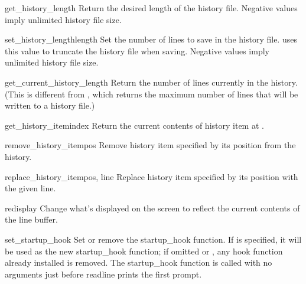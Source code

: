 \begin{funcdesc}{get_history_length}{}
Return the desired length of the history file.  Negative values imply
unlimited history file size.
\end{funcdesc}

\begin{funcdesc}{set_history_length}{length}
Set the number of lines to save in the history file.
 uses this value to truncate the
history file when saving.  Negative values imply unlimited history
file size.
\end{funcdesc}

\begin{funcdesc}{get_current_history_length}{}
Return the number of lines currently in the history.  (This is different
from , which returns the maximum number of
lines that will be written to a history file.)  
\end{funcdesc}

\begin{funcdesc}{get_history_item}{index}
Return the current contents of history item at .
\end{funcdesc}

\begin{funcdesc}{remove_history_item}{pos}
Remove history item specified by its position from the history.
\end{funcdesc}

\begin{funcdesc}{replace_history_item}{pos, line}
Replace history item specified by its position with the given line.
\end{funcdesc}

\begin{funcdesc}{redisplay}{}
Change what's displayed on the screen to reflect the current contents
of the line buffer.  
\end{funcdesc}

\begin{funcdesc}{set_startup_hook}{}
Set or remove the startup_hook function.  If  is specified,
it will be used as the new startup_hook function; if omitted or
, any hook function already installed is removed.  The
startup_hook function is called with no arguments just
before readline prints the first prompt.
\end{funcdesc}

